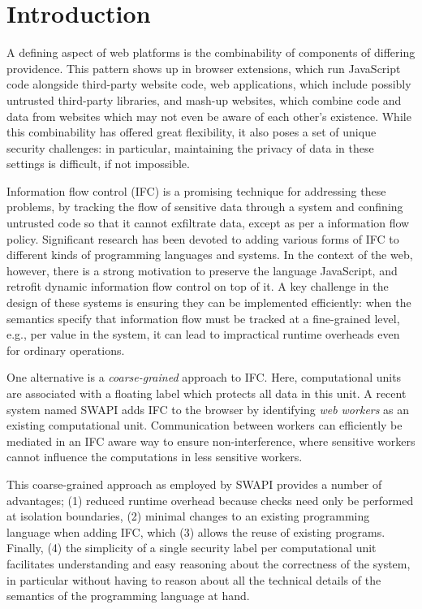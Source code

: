 \section{Introduction}
\label{sec:intro}

A defining aspect of web platforms is the combinability of
components of differing providence.  This pattern shows up in browser
extensions, which run JavaScript code alongside third-party website
code, web applications, which include possibly untrusted third-party
libraries, and mash-up websites, which combine code and data from
websites which may not even be aware of each other's existence.  While
this combinability has offered great flexibility, it also poses a set of
unique security challenges: in particular, maintaining the privacy of
data in these settings is difficult, if not impossible.

Information flow control (IFC) is a promising technique for addressing these
problems, by tracking the flow of sensitive data through a system and
confining untrusted code so that it cannot exfiltrate data, except as
per a information flow policy.  Significant research has been devoted to
adding various forms of IFC to different kinds of programming languages
and systems.  In the context of the web, however, there is a strong
motivation to preserve the language JavaScript, and retrofit dynamic information
flow control on top of it.  A key challenge in the design of these
systems is ensuring they can be implemented efficiently: when the
semantics specify that information flow must be tracked at a
fine-grained level, e.g., per value in the system,  it can lead to
impractical runtime overheads even for ordinary operations.

One alternative is a \textit{coarse-grained} approach to IFC.  Here,
computational units are associated with a floating label which protects
all data in this unit.  A recent system named SWAPI adds IFC to the
browser by identifying \emph{web workers} as an existing computational
unit.  Communication between workers can efficiently be mediated in an
IFC aware way to ensure non-interference, where sensitive workers cannot
influence the computations in less sensitive workers.

This coarse-grained approach as employed by SWAPI provides a number
of advantages; (1) reduced runtime overhead because checks need only
be performed at isolation boundaries, (2) minimal changes to an
existing programming language when adding IFC, which (3) allows
the reuse of existing programs.  Finally, (4) the simplicity
of a single security label per computational unit facilitates
understanding and easy reasoning about the correctness of the
system, in particular without having to reason about all the
technical details of the semantics of the programming language
at hand.

